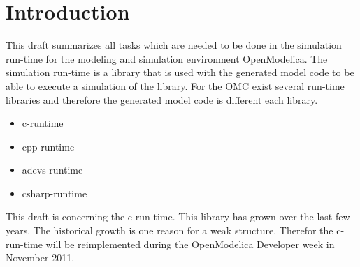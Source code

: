 
%
%

\section{Introduction}\label{sec:intro}

This draft summarizes all tasks which are needed to be done in the simulation
run-time for the modeling and simulation environment OpenModelica. The
simulation run-time is a library that is used with the generated model code to
be able to execute a simulation of the library. For the OMC exist several
run-time libraries and therefore the generated model code is different each
library.

\begin{itemize}
\item c-runtime
\item cpp-runtime
\item adevs-runtime
\item csharp-runtime
\end{itemize}

This draft is concerning the c-run-time. This library has grown over the
last few years. The historical growth is one reason for a weak structure.
Therefor the c-run-time will be reimplemented during the OpenModelica Developer
week in November 2011.

